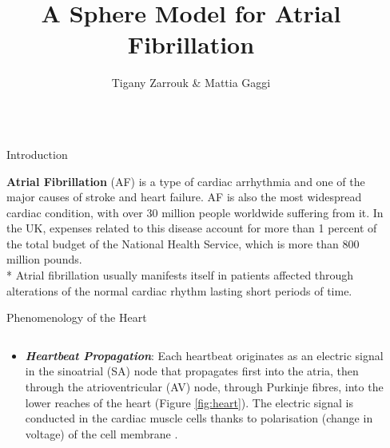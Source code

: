 \documentclass[final,hyperref={pdfpagelabels=false}]{beamer}
\title{\huge A Sphere Model for Atrial Fibrillation} %
\author{Tigany Zarrouk \& Mattia Gaggi } %
\institute{Supervisor: Kim Christensen.  Condensed Matter Theory Group---Imperial College London} %
\begin{document}

\begin{frame}[t] %

\begin{columns}[t] %

\begin{column}{.02\textwidth}\end{column} %

\begin{column}{.465\textwidth} %




            
\begin{block}{Introduction}


\textbf{Atrial Fibrillation} (AF) is a type of cardiac arrhythmia and one of the major causes of stroke and heart failure. AF is also the most widespread cardiac condition, with over 30 million people worldwide suffering from it. In the UK, expenses related to this disease account for more than 1 percent of the total budget of the National Health Service, which is more than 800 million pounds.\\*
 Atrial fibrillation usually manifests itself in patients affected through alterations of the normal cardiac rhythm lasting short periods of time.\\



\end{block}


\begin{block}{Phenomenology of the Heart}

\begin{columns}
\begin{column}{.54\textwidth}
	\begin{itemize}
	\item \textbf{\textit{Heartbeat Propagation}}: Each heartbeat originates as an electric signal in the sinoatrial (SA) node that propagates first into the atria, then through the atrioventricular (AV) node, through Purkinje fibres, into the lower reaches of the heart (Figure \ref{fig:heart}). The electric signal is conducted in the cardiac muscle cells thanks to polarisation (change in voltage) of the cell membrane \cite{Comtois}. 
	\end{itemize}
\end{column}


\end{columns}
\end{block}
\end{column}
\end{columns}
\end{frame}
\end{document}
